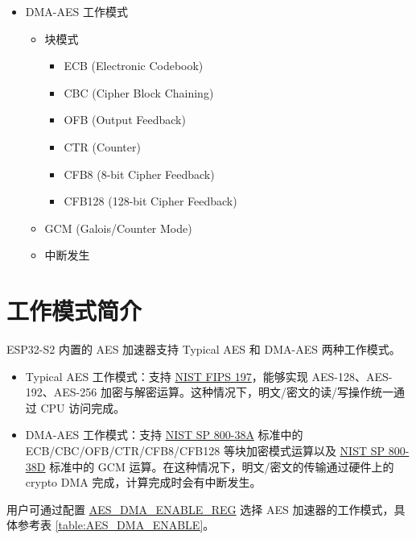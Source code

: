 \documentclass[main\_\_CN.tex]{subfiles}
\begin{document}
    \begin{itemize}
    \item DMA-AES 工作模式
        \begin{itemize}
            \item 块模式
                \begin{itemize}
                    \item ECB (Electronic Codebook)
                    \item CBC (Cipher Block Chaining)
                    \item OFB (Output Feedback)
                    \item CTR (Counter)
                    \item CFB8 (8-bit Cipher Feedback)
                    \item CFB128 (128-bit Cipher Feedback)
                \end{itemize}
            \item GCM (Galois/Counter Mode)
            \item 中断发生
        \end{itemize}
    \end{itemize}

\section{工作模式简介}

ESP32-S2 内置的 AES 加速器支持 Typical AES 和 DMA-AES 两种工作模式。

\begin{itemize}
    \item Typical AES 工作模式：支持 \href{https://nvlpubs.nist.gov/nistpubs/FIPS/NIST.FIPS.197.pdf}{NIST FIPS 197}，能够实现 AES-128、AES-192、AES-256  加密与解密运算。这种情况下，明文/密文的读/写操作统一通过 CPU 访问完成。
    \item DMA-AES 工作模式：支持 \href{https://nvlpubs.nist.gov/nistpubs/Legacy/SP/nistspecialpublication800-38a.pdf}{NIST SP 800-38A} 标准中的 ECB/CBC/OFB/CTR/CFB8/CFB128 等块加密模式运算以及 \href{https://nvlpubs.nist.gov/nistpubs/Legacy/SP/nistspecialpublication800-38d.pdf}{NIST SP 800-38D} 标准中的 GCM 运算。在这种情况下，明文/密文的传输通过硬件上的 crypto DMA 完成，计算完成时会有中断发生。
\end{itemize}

用户可通过配置 \hyperref[regdesc:AESDMAENABLEREG]{AES\_DMA\_ENABLE\_REG} 选择 AES 加速器的工作模式，具体参考表 \ref{table:AES_DMA_ENABLE}。
\end{document}

